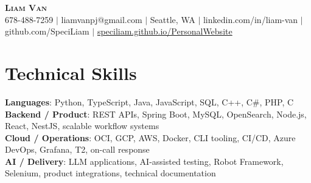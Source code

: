 \documentclass[letterpaper,11pt]{article}
\begin{document}

%
\begin{center}
    \textbf{\Huge \scshape Liam Van} \\ \vspace{1pt}
    \small 678-488-7259 $|$ \small {liamvanpj@gmail.com} $|$ Seattle, WA
 {{$|$ linkedin.com/in/liam-van} {$|$ github.com/SpeciLiam} {$|$ \href{https://speciliam.github.io/PersonalWebsite}{speciliam.github.io/PersonalWebsite}}}

\end{center}

\section{Technical Skills}
 \begin{itemize}[leftmargin=0.15in, label={}]
    \small{\item{
     \textbf{Languages}{: Python, TypeScript, Java, JavaScript, SQL, C++, C\#, PHP, C} \\
     \textbf{Backend / Product}{: REST APIs, Spring Boot, MySQL, OpenSearch, Node.js, React, NestJS, scalable workflow systems} \\
     \textbf{Cloud / Operations}{: OCI, GCP, AWS, Docker, CLI tooling, CI/CD, Azure DevOps, Grafana, T2, on-call response} \\
     \textbf{AI / Delivery}{: LLM applications, AI-assisted testing, Robot Framework, Selenium, product integrations, technical documentation} \\
    }}
 \end{itemize}
%
\end{document}
